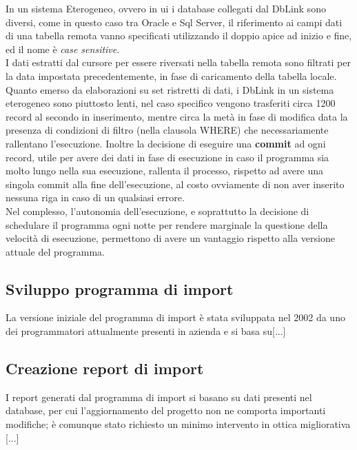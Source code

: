 In un sistema Eterogeneo, ovvero in ui i database collegati dal DbLink sono diversi, come in questo caso tra Oracle e Sql Server, il riferimento ai campi dati di una tabella remota vanno specificati utilizzando il doppio apice ad inizio e fine, ed il nome è \textit{case sensitive}.\\
I dati estratti dal cursore per essere riversati nella tabella remota sono filtrati per la data impostata precedentemente, in fase di caricamento della tabella locale.
Quanto emerso da elaborazioni su set ristretti di dati, i DbLink in un sistema eterogeneo sono piuttosto lenti, nel caso specifico vengono trasferiti circa 1200 record al secondo in inserimento, mentre circa la metà in fase di modifica data la presenza di condizioni di filtro (nella clausola WHERE) che necessariamente rallentano l'esecuzione. Inoltre la decisione di eseguire una \textbf{commit} ad ogni record, utile per avere dei dati in fase di esecuzione in caso il programma sia molto lungo nella sua esecuzione, rallenta il processo, rispetto ad avere una singola commit alla fine dell'esecuzione, al costo ovviamente di non aver inserito nessuna riga in caso di un qualsiasi errore.\\
Nel complesso, l'autonomia dell'esecuzione, e soprattutto la decisione di schedulare il programma ogni notte per rendere marginale la questione della velocità di esecuzione, permettono di avere un vantaggio rispetto alla versione attuale del programma.
\subsection{Sviluppo programma di import}
La versione iniziale del programma di import è stata sviluppata nel 2002 da uno dei programmatori attualmente presenti in azienda e si basa su[...] \\


\subsection{Creazione report di import}
I report generati dal programma di import si basano su dati presenti nel database, per cui l'aggiornamento del progetto non ne comporta importanti modifiche; è comunque stato richiesto un minimo intervento in ottica migliorativa [...]\\